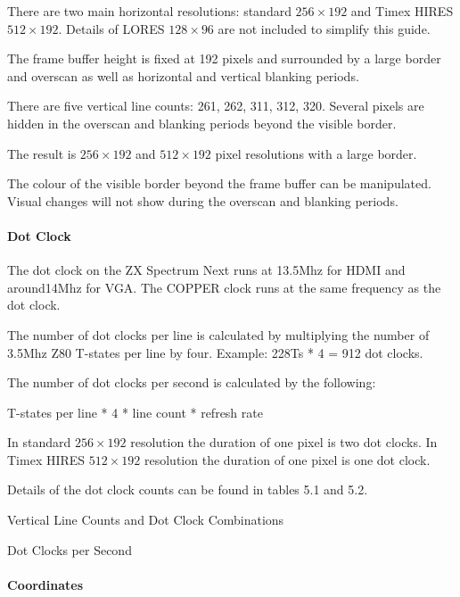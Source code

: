 There are two main horizontal resolutions: standard $256\times192$ and
Timex HIRES $512\times192$. Details of LORES $128\times96$ are not
included to simplify this guide.

The frame buffer height is fixed at 192 pixels and surrounded by a
large border and overscan as well as horizontal and vertical blanking
periods.

There are five vertical line counts: 261, 262, 311, 312, 320. Several
pixels are hidden in the overscan and blanking periods beyond the
visible border.

The result is $256\times192$ and $512\times192$ pixel resolutions with
a large border.

The colour of the visible border beyond the frame buffer can be
manipulated. Visual changes will not show during the overscan and
blanking periods.

\paragraph{Dot Clock}

The dot clock on the ZX Spectrum Next runs at 13.5Mhz for HDMI and
around14Mhz for VGA. The COPPER clock runs at the same frequency as
the dot clock.

The number of dot clocks per line is calculated by multiplying the
number of 3.5Mhz Z80 T-states per line by four. Example: 228Ts * 4 =
912 dot clocks.

The number of dot clocks per second is calculated by the following:

T-states per line * 4 * line count * refresh rate

In standard $256\times192$ resolution the duration of one pixel is two
dot clocks. In Timex HIRES $512\times192$ resolution the duration of
one pixel is one dot clock.

Details of the dot clock counts can be found in tables 5.1 and 5.2.

\begin{table}[h]\centering
  \caption{Vertical Line Counts and Dot Clock Combinations}
\end{table}

\begin{table}[h]\centering
  \caption{Dot Clocks per Second}
\end{table}

\paragraph{Coordinates}

